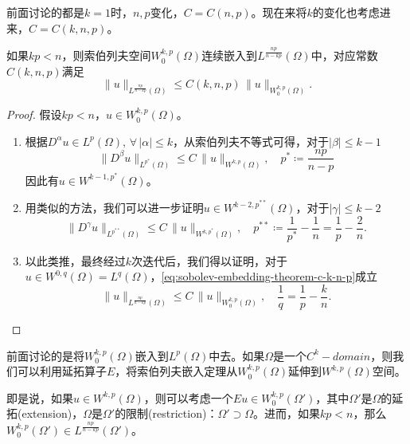 前面讨论的都是$k=1$时，$n,p$变化，$C=C(n,p)$。现在来将$k$的变化也考虑进来，$C=C(k,n,p)$。
\begin{corollary}[索伯列夫空间的嵌入定理$C=C(k,n,p)$]
如果$kp < n$，则索伯列夫空间$W_0^{k,p}(\Omega)$连续嵌入到$L^{\frac{np}{n-kp}}(\Omega)$中，对应常数$C(k,n,p)$满足
\begin{equation}
  \label{eq:sobolev-embedding-theorem-c-k-n-p}
  \big\| u \big\|_{L^{\frac{np}{n-kp}}(\Omega)} \le C(k,n,p) \, \big\| u \big\|_{W^{k,p}_0(\Omega)}.
\end{equation}
\end{corollary}
\begin{proof}
假设$k p < n$，$u \in W_0^{k,p}(\Omega)$。

\begin{enumerate}
  \item 根据$D^{\alpha} u \in L^{p}(\Omega), \, \forall \, \left| \alpha \right| \le k$，从索伯列夫不等式可得，对于$|\beta| \le k-1$
  \begin{equation*}
    \big\| D ^{\beta} u \big\|_{L^{p^{*}}(\Omega)} \le C \, \big\| u \big\|_{W^{k,p}(\Omega)}, \quad p^{*} \coloneqq \frac{np}{n-p}
  \end{equation*}
  因此有$u \in W^{k-1,p^{*}}(\Omega)$。

  \item 用类似的方法，我们可以进一步证明$u \in W^{k-2,p^{**}}(\Omega)$，对于$|\gamma| \le k-2$
  \begin{equation*}
    \big\| D ^{\gamma} u \big\|_{L^{p^{**}}(\Omega)} \le C \, \big\| u \big\|_{W^{k,p^{*}}(\Omega)}, \quad p^{**} \coloneqq \frac{1}{p^{*}} - \frac{1}{n} = \frac{1}{p} - \frac{2}{n}.
  \end{equation*}
  \item 以此类推，最终经过$k$次迭代后，我们得以证明，对于$u \in W^{0,q}(\Omega) = L^{q}(\Omega)$，\eqref{eq:sobolev-embedding-theorem-c-k-n-p}成立
  \begin{equation*}
    \big\| u \big\|_{L^{\frac{np}{n-kp}}(\Omega)} \le C \, \big\| u \big\|_{W^{k,p}_0(\Omega)}, \quad \frac{1}{q} = \frac{1}{p} - \frac{k}{n}.
  \end{equation*}
\end{enumerate}
\end{proof}

前面讨论的是将$W_0^{k,p}(\Omega)$嵌入到$L^{p}(\Omega)$中去。如果$\Omega$是一个$C^{k}-domain$，则我们可以利用延拓算子$E$，将索伯列夫嵌入定理从$W_0^{k,p}(\Omega)$延伸到$W^{k,p}(\Omega)$空间。

即是说，如果$u \in W^{k,p}(\Omega)$，则可以考虑一个$E u \in W_0^{k,p}(\Omega')$，其中$\Omega'$是$\Omega$的延拓(extension)，$\Omega$是$\Omega'$的限制(restriction)：$\Omega' \supset \Omega$。进而，如果$kp < n$，那么$W_0^{k,p}(\Omega') \in L^{\frac{np}{n-kp}}(\Omega')$。

